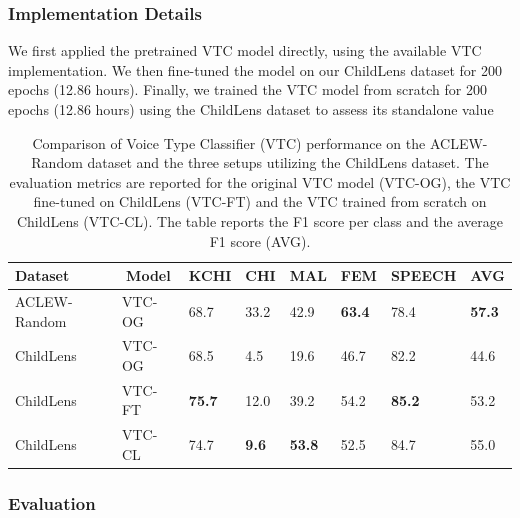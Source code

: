 \documentclass[
  man,floatsintext]{apa6}
\begin{document}
\subsubsection{Implementation Details}\label{implementation-details-1}

We first applied the pretrained VTC model directly, using the available VTC implementation. We then fine-tuned the model on our ChildLens dataset for 200 epochs (12.86 hours). Finally, we trained the VTC model from scratch for 200 epochs (12.86 hours) using the ChildLens dataset to assess its standalone value

\begin{table}[tbp]

\begin{center}
\begin{threeparttable}

\caption{\label{tab:vtc-results}Comparison of Voice Type Classifier (VTC) performance on the ACLEW-Random dataset and the three setups utilizing the ChildLens dataset. The evaluation metrics are reported for the original VTC model (VTC-OG), the VTC fine-tuned on ChildLens (VTC-FT) and the VTC trained from scratch on ChildLens (VTC-CL). The table reports the F1 score per class and the average F1 score (AVG).}

\begin{tabular}{llllllll}
\toprule
Dataset & \multicolumn{1}{c}{Model} & \multicolumn{1}{c}{KCHI} & \multicolumn{1}{c}{CHI} & \multicolumn{1}{c}{MAL} & \multicolumn{1}{c}{FEM} & \multicolumn{1}{c}{SPEECH} & \multicolumn{1}{c}{AVG}\\
\midrule
ACLEW-Random & VTC-OG & 68.7 & 33.2 & 42.9 & \textbf{63.4} & 78.4 & \textbf{57.3}\\
ChildLens & VTC-OG & 68.5 & 4.5 & 19.6 & 46.7 & 82.2 & 44.6\\
ChildLens & VTC-FT & \textbf{75.7} & 12.0 & 39.2 & 54.2 & \textbf{85.2} & 53.2\\
ChildLens & VTC-CL & 74.7 & \textbf{9.6} & \textbf{53.8} & 52.5 & 84.7 & 55.0\\
\bottomrule
\end{tabular}

\end{threeparttable}
\end{center}

\end{table}

\subsubsection{Evaluation}\label{evaluation-1}
\end{document}
